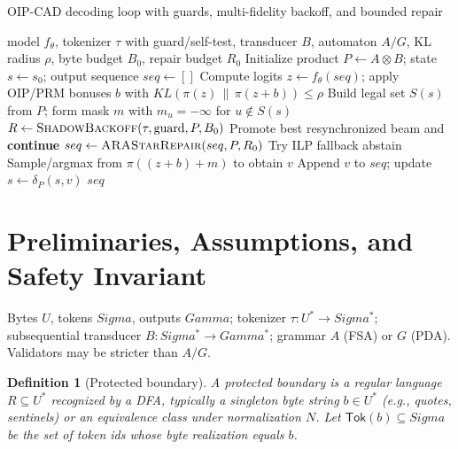 \documentclass{article}
\def\Gamma{Gamma}%
\def\Sigma{Sigma}%
\def\mathcal#1{#1}%
\def\mathrm#1{#1}%
\newtheorem{definition}{Definition}
\begin{document}
\begin{algorithm}[h]
\caption{OIP-CAD decoding loop with guards, multi-fidelity backoff, and bounded repair}
\label{alg:decode_loop}
\begin{algorithmic}[1]
\Require model $f_\theta$, tokenizer $\tau$ with guard/self-test, transducer $\mathcal{B}$, automaton $\mathcal{A}/\mathcal{G}$, KL radius $\rho$, byte budget $B_0$, repair budget $R_0$
\State Initialize product $\mathcal{P}\gets \mathcal{A}\otimes\mathcal{B}$; state $s\gets s_0$; output sequence $\mathrm{seq}\gets[]$
  \State Compute logits $z\gets f_\theta(\mathrm{seq})$; apply OIP/PRM bonuses $b$ with $\mathrm{KL}(\pi(z)\,\|\,\pi(z{+}b))\le \rho$
  \State Build legal set $\mathcal{S}(s)$ from $\mathcal{P}$; form mask $m$ with $m_u=-\infty$ for $u\notin\mathcal{S}(s)$
  \If{$\mathcal{S}(s)=\emptyset$} 
    \State $R \gets \textsc{ShadowBackoff}(\tau, \text{guard}, \mathcal{P}, B_0)$ 
       \State Promote best resynchronized beam and \textbf{continue}
    \Else
       \State $\mathrm{seq}\gets \textsc{ARAStarRepair}(\mathrm{seq}, \mathcal{P}, R_0)$ 
         \State Try ILP fallback
       \EndIf
         \State \Return abstain
       \EndIf
    \EndIf
  \Else
    \State Sample/argmax from $\pi((z{+}b)+m)$ to obtain $v$
    \State Append $v$ to $\mathrm{seq}$; update $s\gets\delta_{\mathcal{P}}(s,v)$
  \EndIf
\EndWhile
\State \Return $\mathrm{seq}$
\end{algorithmic}
\end{algorithm}

\section{Preliminaries, Assumptions, and Safety Invariant}
Bytes $\mathcal{U}$, tokens $\Sigma$, outputs $\Gamma$; tokenizer $\tau:\mathcal{U}^\ast\to\Sigma^\ast$; subsequential transducer $\mathcal{B}:\Sigma^\ast\to\Gamma^\ast$; grammar $\mathcal{A}$ (FSA) or $\mathcal{G}$ (PDA). Validators may be stricter than $\mathcal{A}/\mathcal{G}$.

\begin{definition}[Protected boundary]
A protected boundary is a regular language $\mathcal{R}\subseteq\mathcal{U}^\ast$ recognized by a DFA, typically a singleton byte string $b\in\mathcal{U}^\ast$ (e.g., quotes, sentinels) or an equivalence class under normalization $\mathcal{N}$. Let $\mathsf{Tok}(b)\subseteq\Sigma$ be the set of token ids whose byte realization equals $b$.
\end{definition}
\end{document}

